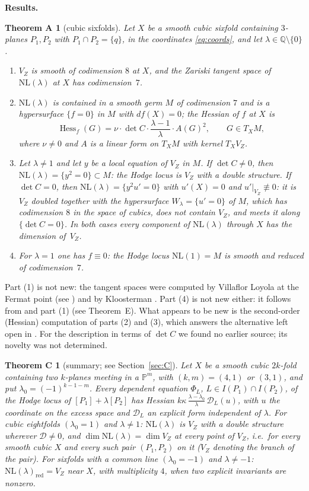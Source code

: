\documentclass[10pt]{article}
\numberwithin{equation}{section}
\newtheorem*{thmA}{Theorem A}
\newtheorem*{thmC}{Theorem C}
\theoremstyle{remark}
\newcommand{\PP}{\mathbb{P}}
\newcommand{\QQ}{\mathbb{Q}}
\newcommand{\NL}{\mathrm{NL}}
\newcommand{\VZ}{V_Z}
\newcommand{\cD}{\mathcal{D}}
\newcommand{\Hess}{\operatorname{Hess}}
\newcommand{\run}[1]{\medskip\noindent\textbf{#1}}
\begin{document}
\run{Results.}
\begin{thmA}[cubic sixfolds]
Let $X$ be a smooth cubic sixfold containing $3$-planes $P_1,P_2$ with $P_1\cap P_2=\{q\}$, in the coordinates
\eqref{eq:coords}, and let $\lambda\in\QQ\setminus\{0\}$.
\begin{enumerate}[label=\textup{(\arabic*)}]
\item $\VZ$ is smooth of codimension $8$ at $X$, and the Zariski tangent space of $\NL(\lambda)$ at $X$ has
codimension~$7$.
\item $\NL(\lambda)$ is contained in a smooth germ $M$ of codimension $7$ and is a hypersurface $\{f=0\}$ in $M$
with $df(X)=0$; the Hessian of $f$ at $X$ is
\[
\Hess_f(G)=\nu\cdot\det C\cdot\frac{\lambda-1}{\lambda}\cdot A(G)^2,\qquad G\in T_XM,
\]
where $\nu\neq0$ and $A$ is a linear form on $T_XM$ with kernel $T_X\VZ$.
\item Let $\lambda\neq1$ and let $y$ be a local equation of $\VZ$ in $M$.
If $\det C\neq0$, then $\NL(\lambda)=\{y^2=0\}\subset M$: the Hodge locus is $\VZ$ with a double structure.
If $\det C=0$, then $\NL(\lambda)=\{y^2u'=0\}$ with $u'(X)=0$ and $u'|_{\VZ}\not\equiv 0$: it is $\VZ$
doubled together with the hypersurface $W_\lambda=\{u'=0\}$ of $M$, which has codimension $8$ in the space of
cubics, does not contain $\VZ$, and meets it along $\{\det C=0\}$.
In both cases every component of $\NL(\lambda)$ through $X$ has the dimension of~$\VZ$.
\item For $\lambda=1$ one has $f\equiv 0$: the Hodge locus $\NL(1)=M$ is smooth and reduced of codimension~$7$.
\end{enumerate}
\end{thmA}
Part (1) is not new: the tangent spaces were computed by Villaflor Loyola at the Fermat point (see
\cite[Prop.~5.6]{Mo3}) and by Kloosterman \cite[Theorem~1.3]{Kl1}. Part (4) is not new either: it follows from
\cite[Prop.~6.4, Cor.~6.5]{Kl1} and part (1) (see Theorem~E). What appears to be new is the second-order
(Hessian) computation of parts (2) and (3), which answers the alternative left open in \cite{Kl1}. For the
description in terms of $\det C$ we found no earlier source; its novelty was not determined.

\begin{thmC}[summary; see Section~\ref{sec:C}]
Let $X$ be a smooth cubic $2k$-fold containing two $k$-planes meeting in a $\PP^m$, with $(k,m)=(4,1)$ or
$(3,1)$, and put $\lambda_0=(-1)^{k-1-m}$. Every dependent equation $\Phi_L$, $L\in I(P_1)\cap I(P_2)$, of the
Hodge locus of $[P_1]+\lambda[P_2]$ has Hessian $k\kappa\,\frac{\lambda-\lambda_0}{\lambda}\,\cD_L(u)$, with $u$
the coordinate on the excess space and $\cD_L$ an explicit form independent of $\lambda$. For cubic eightfolds
$(\lambda_0=1)$ and $\lambda\ne1$: $\NL(\lambda)$ is $\VZ$ with a double structure wherever $\cD\neq0$, and
$\dim\NL(\lambda)=\dim\VZ$ at every point of $\VZ$, i.e.\ for every smooth cubic $X$ and every such pair
$(P_1,P_2)$ on it \textup{(}$\VZ$ denoting the branch of the pair\textup{)}. For sixfolds with a common line
$(\lambda_0=-1)$ and
$\lambda\ne-1$: $\NL(\lambda)_{\mathrm{red}}=\VZ$ near $X$, with multiplicity $4$, when two explicit invariants
are nonzero.
\end{thmC}
\end{document}
